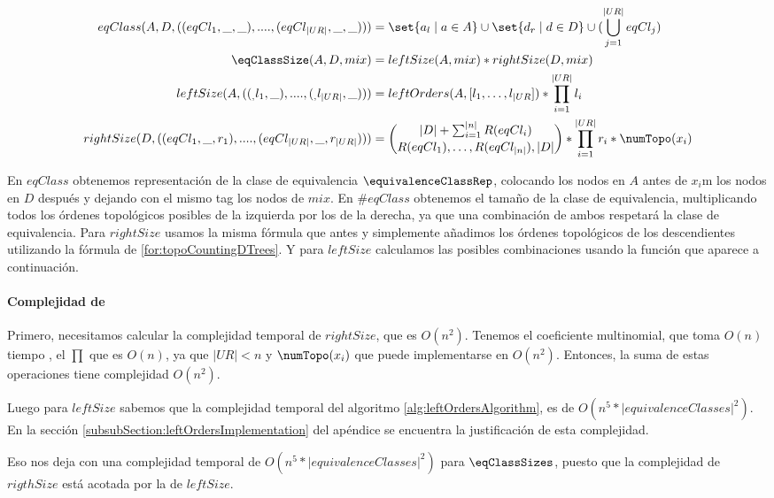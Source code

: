 \begin{align*}
eqClass(A, D, ((eqCl_1, \_ , \_ ), ...., (eqCl_{|UR|}, \_ , \_))) 
    &=  \set{a_l \mid a \in A} \cup \set{d_r \mid d \in D} \cup (\bigcup_{j=1}^{|UR|} eqCl_j) \\ 
\eqClassSize(A, D, mix) 
    &= leftSize(A,mix) * rightSize(D, mix)  \\ 
leftSize(A, ((_, l_1, \_), ...., (_, l_{|UR|}, \_))) 
    &= leftOrders(A, [ l_1, \dots, l_{|UR}]) * \prod_{i=1}^{|UR|} l_i  \\
rightSize(D, ((eqCl_1, \_, r_1), ...., (eqCl_{|UR|}, \_, r_{|UR|} ))) 
    &= \binom{|D| + \sum_{i=1}^{|n|} R(eqCl_i)}{R(eqCl_1), \ldots, R(eqCl_{|n|}), |D|} * \prod_{i=1}^{|UR|} r_i * \numTopo(x_i)
\end{align*}


En $eqClass$ obtenemos representación de la clase de equivalencia $\equivalenceClassRep$, colocando los nodos en $A$ antes de $x_i$m los nodos en $D$ después y dejando con el mismo tag los nodos de $mix$. En $\#eqClass$ obtenemos el tamaño de la clase de equivalencia, multiplicando todos los órdenes topológicos posibles de la izquierda por los de la derecha, ya que una combinación de ambos respetará la clase de equivalencia. Para $rightSize$ usamos la misma fórmula que antes y simplemente añadimos los órdenes topológicos de los descendientes utilizando la fórmula de \ref{for:topoCountingDTrees}. Y para $leftSize$ calculamos las posibles combinaciones usando la función que aparece a continuación.

\paragraph{Complejidad de \eqClassSize} \label{subsubSection:eqClassComplexity}

Primero, necesitamos calcular la complejidad temporal de $rightSize$, que es $O(n^2)$. Tenemos el coeficiente multinomial, que toma $O(n)$ tiempo , el $\prod$ que es $O(n)$, ya que $|UR|<n$ y $\numTopo(x_i)$ que puede implementarse en $O(n^2)$. Entonces, la suma de estas operaciones tiene complejidad $O(n^2)$.


Luego para $leftSize$ sabemos que la complejidad temporal del algoritmo \ref{alg:leftOrdersAlgorithm}, es de $O(n^5 * |equivalenceClasses|^2)$. En la sección \ref{subsubSection:leftOrdersImplementation} del apéndice se encuentra la justificación de esta complejidad. 

Eso nos deja con una complejidad temporal de $O(n^5 * |equivalenceClasses|^2)$ para $\eqClassSizes$, puesto que la complejidad de $rigthSize$ está acotada por la de $leftSize$.



